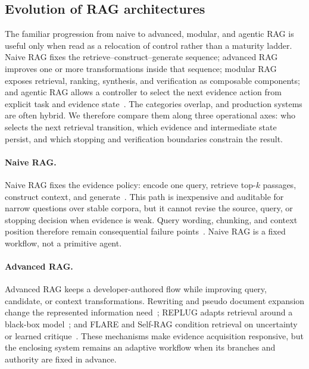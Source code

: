 \subsection{Evolution of RAG architectures}

The familiar progression from naive to advanced, modular, and agentic RAG is useful only when read as a relocation of control rather than a maturity ladder. Naive RAG fixes the retrieve--construct--generate sequence; advanced RAG improves one or more transformations inside that sequence; modular RAG exposes retrieval, ranking, synthesis, and verification as composable components; and agentic RAG allows a controller to select the next evidence action from explicit task and evidence state~\cite{gao2023ragsurvey,singh2025agenticragsurvey}. The categories overlap, and production systems are often hybrid. We therefore compare them along three operational axes: who selects the next retrieval transition, which evidence and intermediate state persist, and which stopping and verification boundaries constrain the result.

\paragraph{Naive RAG.}
Naive RAG fixes the evidence policy: encode one query, retrieve top-$k$ passages, construct context, and generate~\cite{lewis2020rag}. This path is inexpensive and auditable for narrow questions over stable corpora, but it cannot revise the source, query, or stopping decision when evidence is weak. Query wording, chunking, and context position therefore remain consequential failure points~\cite{liu2024lostinthemiddle}. Naive RAG is a fixed workflow, not a primitive agent.

\paragraph{Advanced RAG.}
Advanced RAG keeps a developer-authored flow while improving query, candidate, or context transformations. Rewriting and pseudo document expansion change the represented information need~\cite{ma2023queryrewriting,wang2023query2doc}; REPLUG adapts retrieval around a black-box model~\cite{shi2023replug}; and FLARE and Self-RAG condition retrieval on uncertainty or learned critique~\cite{jiang2023flare,asai2024selfrag}. These mechanisms make evidence acquisition responsive, but the enclosing system remains an adaptive workflow when its branches and authority are fixed in advance.

